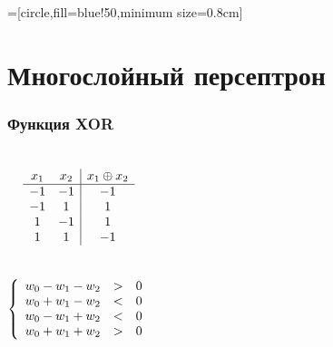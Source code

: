 \documentclass[24pt,pdf,hyperref={unicode},aspectratio=169]{beamer}
\begin{document}
=[circle,fill=blue!50,minimum size=0.8cm]



\section{Многослойный персептрон}

\begin{frame}\frametitle{Функция XOR}
\begin{columns}
$$
\begin{array}{c c | c}
x_1 & x_2 & x_1\oplus x_2 \\
\hline
-1 & -1 & -1 \\
-1 & 1 & 1 \\
1 & -1 & 1 \\
1 & 1 & -1 \\
\end{array}
$$\\[1cm]
$$
\left\{
\begin{array}{l l l l l l}
 w_0 - w_1 - w_2  & > & 0 \\
 w_0 + w_1 - w_2 & < & 0 \\
 w_0 - w_1 + w_2 & < & 0 \\
 w_0 + w_1 + w_2 & > & 0 \\
\end{array}
\right.
$$
\end{columns}
\end{frame}
\end{document}
